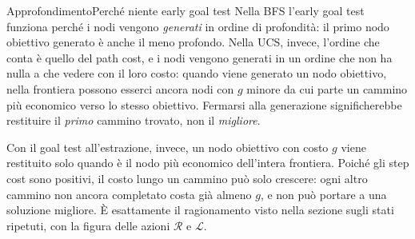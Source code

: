 \documentclass[a4paper, 11pt, oneside]{book}
\theoremstyle{definition}
\begin{document}
	\begin{nota}
		{Approfondimento}{Perch\'e niente early goal test}
		Nella BFS l'early goal test funziona perch\'e i nodi vengono \emph{generati} in
		ordine di profondit\`a: il primo nodo obiettivo generato \`e anche il meno profondo.
		Nella UCS, invece, l'ordine che conta \`e quello del path cost, e i nodi vengono
		generati in un ordine che non ha nulla a che vedere con il loro costo: quando viene
		generato un nodo obiettivo, nella frontiera possono esserci ancora nodi con $g$
		minore da cui parte un cammino pi\`u economico verso lo stesso obiettivo. Fermarsi
		alla generazione significherebbe restituire il \emph{primo} cammino trovato, non il
		\emph{migliore}.

		Con il goal test all'estrazione, invece, un nodo obiettivo con costo $g$ viene
		restituito solo quando \`e il nodo pi\`u economico dell'intera frontiera. Poich\'e
		gli step cost sono positivi, il costo lungo un cammino pu\`o solo crescere: ogni altro
		cammino non ancora completato costa gi\`a almeno $g$, e non pu\`o portare a una
		soluzione migliore. \`E esattamente il ragionamento visto nella sezione sugli stati
		ripetuti, con la figura delle azioni $\mathcal{R}$ e $\mathcal{L}$.
	\end{nota}
\end{document}
